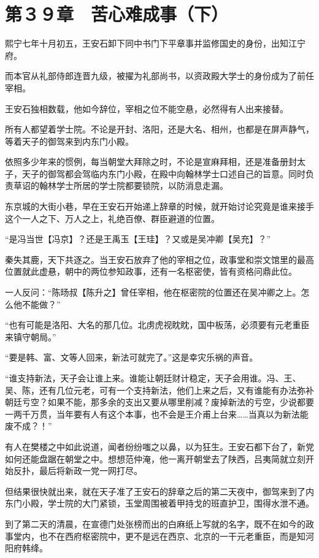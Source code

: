 \section{第３９章　苦心难成事（下）}

熙宁七年十月初五，王安石卸下同中书门下平章事并监修国史的身份，出知江宁府。

而本官从礼部侍郎连晋九级，被擢为礼部尚书，以资政殿大学士的身份成为了前任宰相。

王安石独相数载，他如今辞位，宰相之位不能空悬，必然得有人出来接替。

所有人都望着学士院。不论是开封、洛阳，还是大名、相州，也都是在屏声静气，等着天子的御驾来到内东门小殿。

依照多少年来的惯例，每当朝堂大拜除之时，不论是宣麻拜相，还是准备册封太子，天子的御驾都会驾临内东门小殿，在殿中向翰林学士口述自己的旨意。同时负责草诏的翰林学士所居的学士院都要锁院，以防消息走漏。

东京城的大街小巷，早在王安石开始递上辞章的时候，就开始讨论究竟是谁来接手这个一人之下、万人之上，礼绝百僚、群臣避道的位置。

“是冯当世【冯京】？还是王禹玉【王珪】？又或是吴冲卿【吴充】？”

秦失其鹿，天下共逐之。当王安石放弃了他的宰相之位，政事堂和崇文馆里的最高位置就此虚悬，朝中的两位参知政事，还有一名枢密使，皆有资格问鼎此位。

一人反问：“陈旸叔【陈升之】曾任宰相，他在枢密院的位置还在吴冲卿之上。怎么他不能做？”

“也有可能是洛阳、大名的那几位。北虏虎视眈眈，国中板荡，必须要有元老重臣来镇守朝局。”

“要是韩、富、文等人回来，新法可就完了。”这是幸灾乐祸的声音。

“谁支持新法，天子会让谁上来。谁能让朝廷财计稳定，天子会用谁。冯、王、吴、陈，还有几位元老，可有一个支持新法，他们上来之后，又有谁能有办法弥补朝廷亏空？如果不能，那多余的支出又要从哪里削减？废掉新法的亏空，少说都要一两千万贯，当年要有人有这个本事，也不会是王介甫上台来……当真以为新法能废不成？！”

有人在樊楼之中如此说道，闻者纷纷嗤之以鼻，以为狂生。王安石都下台了，新党如何还能盘踞在朝堂之中。想想范仲淹，他一离开朝堂去了陕西，吕夷简就立刻开始反扑，最后将新政一党一网打尽。

但结果很快就出来，就在天子准了王安石的辞章之后的第二天夜中，御驾来到了内东门小殿，学士院的大门紧锁，玉堂周围被着甲持戈的班直护卫，围得水泄不通。

到了第二天的清晨，在宣德门处张榜而出的白麻纸上写就的名字，既不在如今的政事堂内，也不在西府枢密院中，更不是远在西京、北京的一干元老重臣，而是知河阳府韩绛。


